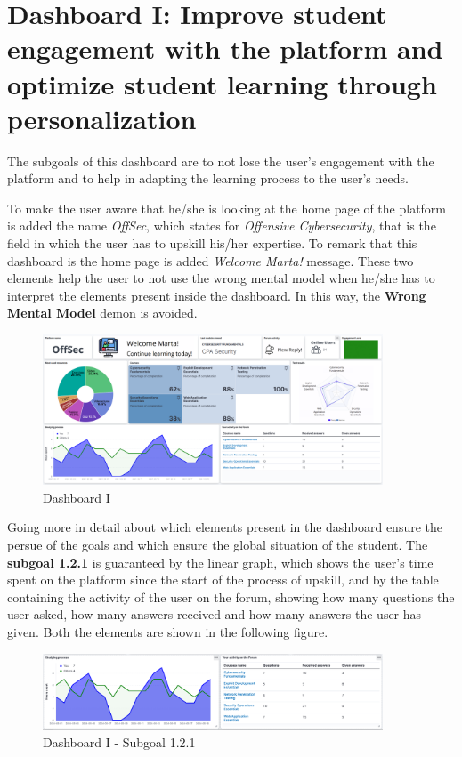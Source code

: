 \section{Dashboard I: Improve student engagement with the platform and optimize student learning through personalization}

The subgoals of this dashboard are to not lose the user's engagement with 
the platform and to help in adapting the learning process to the user's
needs. 

To make the user aware that he/she is looking
at the home page of the platform is added the name \textit{OffSec},
which states for \textit{Offensive Cybersecurity}, that is the field
in which the user has to upskill his/her expertise. To remark that this
dashboard is the home page is added \textit{Welcome Marta!} message.
These two elements help the user to not use the wrong mental model
when he/she has to interpret the elements present inside the dashboard.
In this way, the \textbf{Wrong Mental Model} demon is avoided.


\begin{figure}[H]
    \centering
    \includegraphics[width=0.9\textwidth]{assets/dashboard_1.png}
    \caption{Dashboard I}
    \label{fig:dashboard_1}
\end{figure}

Going more in detail about which elements present in the dashboard 
ensure the persue of the goals and which ensure the global situation
of the student. The \textbf{subgoal 1.2.1} is guaranteed by the linear graph,
which shows the user's time spent on the platform since the start of
the process of upskill, and by the table containing the activity of the
user on the forum, showing how many questions the user asked, how many
answers received and how many answers the user has given. 
Both the elements are shown in the following figure.

\begin{figure}[H]
    \centering
    \includegraphics[width=0.9\textwidth]{assets/dashboard_1_121.png}
    \caption{Dashboard I - Subgoal 1.2.1}
    \label{fig:dashboard_1_subgoal_121}
\end{figure}


